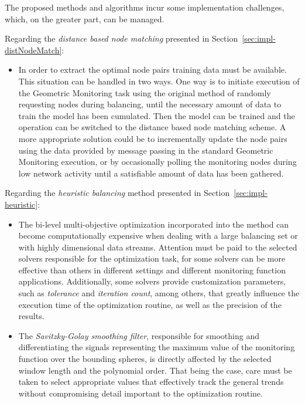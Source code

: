 The proposed methods and algorithms incur some implementation challenges, which, on the greater part, can be managed.

Regarding the \emph{distance based node matching} presented in Section~\ref{sec:impl-distNodeMatch}: 
\begin{itemize}
\item In order to extract the optimal node pairs training data must be available. This situation can be handled in two ways. One way is to initiate execution of the Geometric Monitoring task using the original method of randomly requesting nodes during balancing, until the necessary amount of data to train the model has been cumulated. Then the model can be trained and the operation can be switched to the distance based node matching scheme. A more appropriate solution could be to incrementally update the node pairs using the data provided by message passing in the standard Geometric Monitoring execution, or by occasionally polling the monitoring nodes during low network activity until a satisfiable amount of data has been gathered.
\end{itemize}

Regarding the \emph{heuristic balancing} method presented in Section~\ref{sec:impl-heuristic}:
\begin{itemize}
\item The bi-level multi-objective optimization incorporated into the method can become computationally expensive when dealing with a large balancing set or with highly dimensional data streams. Attention must be paid to the selected solvers responsible for the optimization task, for some solvers can be more effective than others in different settings and different monitoring function applications. Additionally, some solvers provide customization parameters, such as \emph{tolerance} and \emph{iteration count}, among others, that greatly influence the execution time of the optimization routine, as well as the precision of the results.
\item The \emph{Savitzky-Golay smoothing filter}, responsible for smoothing and differentiating the signals representing the maximum value of the monitoring function over the bounding spheres, is directly affected by the selected window length and the polynomial order. That being the case, care must be taken to select appropriate values that effectively track the general trends without compromising detail important to the optimization routine.
\end{itemize}